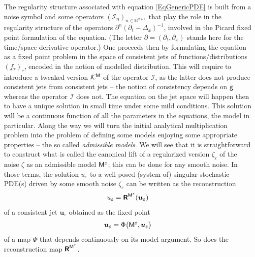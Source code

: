 \documentclass[10pt, reqno]{amsart}
\numberwithin{subsection}{section}
\numberwithin{subsubsection}{subsection}
\numberwithin{equation}{section} %
\theoremstyle{mystyle}
\theoremstyle{mystyle2}
\theoremstyle{mystyle3}
\newcommand{\bsu}{\boldsymbol{u}}
\newcommand{\ssk}{\smallskip}
\renewcommand{\epsilon}{\varepsilon}
\newcommand\bbN{\mathbb{N}}
\newcommand{\mcI}{\mathcal{I}}
\begin{document}
\ssk

 The regularity structure associated with equation \eqref{EqGenericPDE} is built from a noise symbol and some operators $(\mcI_n)_{n\in\bbN^{d+1}}$ that play the role in the regularity structure of the operators $\partial^n(\partial_t-\Delta_x)^{-1}$, involved in the Picard fixed point formulation of the equation. (The letter $\partial=(\partial_t,\partial_x)$ stands here for the time/space derivative operator.) One proceeds then by formulating the equation as a fixed point problem in the space of consistent jets of functions/distributions $(f_\tau)_\tau$, encoded in the notion of modelled distribution. This will require to introduce a tweaked version $\mathcal{K}^{\sf M}$ of the operator $\mcI$, as the latter does not produce consistent jets from consistent jets -- the notion of consistency depends on $\sf g$ whereas the operator $\mcI$ does not. The equation on the jet space will happen then to have a unique solution in small time under some mild conditions. This solution will be a continuous function of all the parameters in the equations, the model in particular. Along the way we will turn the initial analytical multiplication problem into the problem of defining some models enjoying some appropriate properties -- the so called {\it admissible models}. We will see that it is straightforward to construct what is called the canonical lift of a regularized version $\zeta_\epsilon$ of the noise $\zeta$ as an admissible model ${\sf M}^{\epsilon}$; this can be done for any smooth noise. In those terms, the solution $u_\epsilon$ to a well-posed (system of) singular stochastic PDE(s) driven by some smooth noise $\zeta_\epsilon$ can be written as the reconstruction
\begin{equation} \label{EqSolProjection}
u_\epsilon = \textsf{\textbf{R}}^{{\sf M}^\epsilon}(\bsu_\epsilon)
\end{equation}
of a consistent jet $\bsu_\epsilon$ obtained as the fixed point 
\begin{equation} \label{EqFixedPoint}
\bsu_\epsilon = \Phi\big({\sf M}^\epsilon, \bsu_\epsilon\big)
\end{equation}
of a map $\Phi$ that depends continuously on its model argument. So does the reconstruction map $\textsf{\textbf{R}}^{{\sf M}^\epsilon}$. 

\ssk
\end{document}
